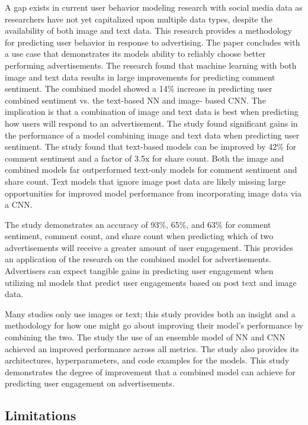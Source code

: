 \documentclass[mksc,blindrev]{informs3} %
\begin{document}
A gap exists in current user behavior modeling research with social media data as researchers have not yet capitalized upon multiple data types, despite the availability of both image and text data. This research provides a methodology for predicting user behavior in response to advertising. The paper concludes with a use case that demonstrates its models ability to reliably choose better performing advertisements. The research found that machine learning with both image and text data results in large improvements for predicting comment sentiment. The combined model showed a 14\% increase in predicting user combined sentiment vs. the text-based NN and image- based CNN. The implication is that a combination of image and text data is best when predicting how users will respond to an advertisement. The study found significant gains in the performance of a model combining image and text data when predicting user sentiment. The study found that text-based models can be improved by 42\% for comment sentiment and a factor of 3.5x for share count. Both the image and combined models far outperformed text-only models for comment sentiment and share count. Text models that ignore image post data are likely missing large opportunities for improved model performance from incorporating image data via a CNN.

The study demonstrates an accuracy of 93\%, 65\%, and 63\% for comment sentiment, comment count, and share count when predicting which of two advertisements will receive a greater amount of user engagement. This provides an application of the research on the combined model for advertisements. Advertisers can expect tangible gains in predicting user engagement when utilizing ml models that predict user engagements based on post text and image data.

Many studies only use images or text; this study provides both an insight and a methodology for how one might go about improving their model’s performance by combining the two. The study the use of an ensemble model of NN and CNN achieved an improved performance across all metrics. The study also provides its architectures, hyperparameters, and code examples for the models. This study demonstrates the degree of improvement that a combined model can achieve for predicting user engagement on advertisements.

\subsection{Limitations}
\end{document}
